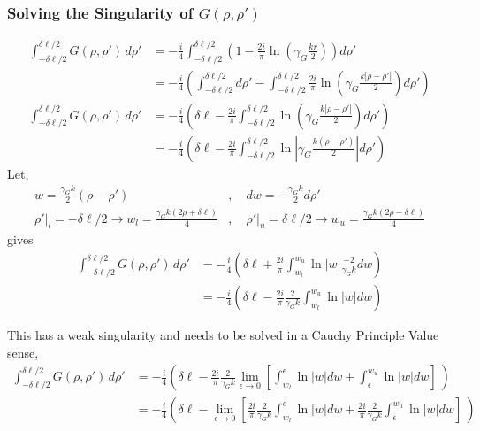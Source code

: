 \documentclass{article}
\newcommand{\0}{\varnothing}
\begin{document}
\subsubsection{Solving the Singularity of $G(\rho, \rho')$}
\begin{align*}
    \int_{-\delta\ell/2}^{\delta\ell/2} G(\rho,\rho')\, d\rho' &= -\frac{i}{4} \int_{-\delta\ell/2}^{\delta\ell/2}  \left( 1 - \frac{2i}{\pi} \ln \left( \gamma_G \frac{kr}{2}\right) \right) d\rho' \\
        &= -\frac{i}{4} \left( \int_{-\delta\ell/2}^{\delta\ell/2}  d\rho' - \int_{-\delta\ell/2}^{\delta\ell/2} \frac{2i}{\pi} \ln \left( \gamma_G \frac{k |\rho - \rho'|}{2}\right)d\rho' \right)  \\
     \int_{-\delta\ell/2}^{\delta\ell/2} G(\rho,\rho')\, d\rho' &= -\frac{i}{4} \left( \delta \ell - \frac{2i}{\pi} \int_{-\delta\ell/2}^{\delta\ell/2} \ln \left( \gamma_G \frac{k |\rho - \rho'|}{2}\right)d\rho' \right)  \\
     &= -\frac{i}{4} \left( \delta \ell - \frac{2i}{\pi} \int_{-\delta\ell/2}^{\delta\ell/2} \ln \left|\gamma_G \frac{k (\rho - \rho')}{2}\right |d\rho' \right) 
\end{align*}
Let, 
\begin{align*}
	w = \frac{\gamma_G k}{2}(\rho-\rho')&, \quad dw  = -\frac{\gamma_G k}{2} d\rho'\\ 
	\rho'|_l = - \delta \ell/2 \rightarrow w_l = \frac{\gamma_G k (2\rho+\delta \ell)}{4}&, \quad \rho'|_u =  \delta \ell/2 \rightarrow w_u = \frac{\gamma_G k (2\rho-\delta \ell)}{4}
\end{align*}
gives 
\begin{align*}
     \int_{-\delta\ell/2}^{\delta\ell/2} G(\rho,\rho')\, d\rho' &= -\frac{i}{4} \left( \delta \ell + 
     \frac{2i}{\pi} \int_{w_l}^{w_u} \ln | w | \frac{-2}{\gamma_G k} dw \right)\\
     &= -\frac{i}{4} \left( \delta \ell - \frac{2i}{\pi} \frac{2}{\gamma_G k} \int_{w_l}^{w_u} \ln | w |  dw  \right)
\end{align*}

This has a weak singularity and needs to be solved in a Cauchy Principle Value sense, 
\begin{align*}
     \int_{-\delta\ell/2}^{\delta\ell/2} G(\rho,\rho')\, d\rho' 
     &= -\frac{i}{4} \left( \delta \ell -  \frac{2i}{\pi} \frac{2}{\gamma_G k} \lim_{\epsilon \to 0} \left[ \int_{w_l}^{\epsilon} \ln | w |  dw +  \int_{\epsilon}^{w_u} \ln | w |  dw\right] \ \right)\\
     &= -\frac{i}{4} \left( \delta \ell - \lim_{\epsilon \to 0} \left[\frac{2i}{\pi} \frac{2}{\gamma_G k} \int_{w_l}^{\epsilon} \ln | w |  dw + \frac{2i}{\pi} \frac{2}{\gamma_G k} \int_{\epsilon}^{w_u} \ln | w |  dw\right] \ \right)\\
\end{align*}
\end{document}
